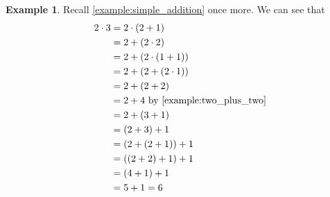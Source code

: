 \documentclass{article}
\theoremstyle{definition}
\theoremstyle{definition}
\newtheorem{example}{Example}[section]
\theoremstyle{plain}
\theoremstyle{remark}
\theoremstyle{plain}
\theoremstyle{remark}
\theoremstyle{plain}
\theoremstyle{plain}
\theoremstyle{plain}
\theoremstyle{plain}
\begin{document}
\begin{example}
  Recall \autoref{example:simple_addition} once more. We can see that 
  \begin{align*}
    2 \cdot 3 &= 2 \cdot (2 + 1) \\
              &= 2 + (2 \cdot 2) \\
              &= 2 + (2 \cdot (1 + 1)) \\
              &= 2 + (2 + (2 \cdot 1 )) \\
              &= 2 + (2 + 2) \\
              &= 2 + 4 \text{ by \autoref{example:two_plus_two}} \\
              &= 2 + (3 + 1) \\
              &= (2 + 3) + 1 \\
              &= (2 + (2 + 1)) + 1 \\
              &= ((2 + 2) + 1) + 1 \\
              &= (4 + 1) + 1 \\
              &= 5 + 1 = 6 
  \end{align*}
\end{example}



\end{document}
